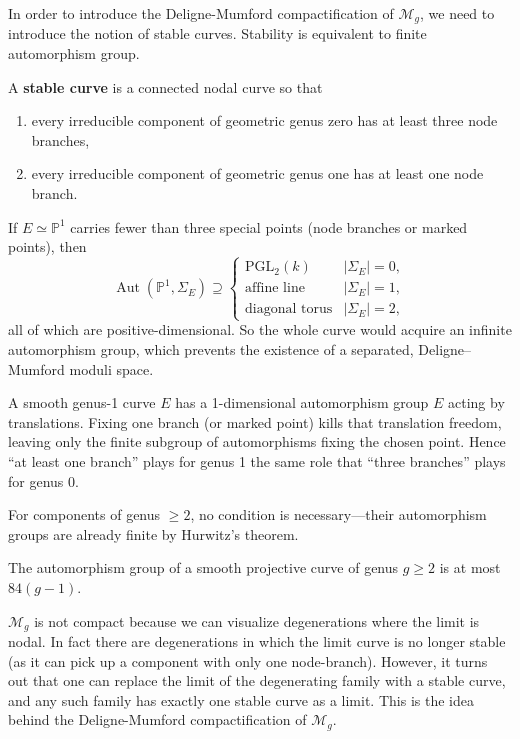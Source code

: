 \documentclass[12pt]{article}
\begin{document}
In order to introduce the Deligne-Mumford compactification of $\mathcal{M}_g$, we need to introduce the notion of stable curves. Stability is equivalent to finite automorphism group.
\begin{definition}
    A \textbf{stable curve} is a connected nodal curve so that \begin{enumerate}
        \item every irreducible component of geometric genus zero has at least three node branches,
        \item every irreducible component of geometric genus one has at least one node branch. 
    \end{enumerate}
\end{definition}

If $E \simeq \mathbb{P}^1$ carries fewer than three special points (node branches or marked points), then
    \[
    \operatorname{Aut}(\mathbb{P}^1, \Sigma_E) \supseteq
    \begin{cases}
        \mathrm{PGL}_2(k) & |\Sigma_E| = 0, \\[4pt]
        \text{affine line} & |\Sigma_E| = 1, \\[4pt]
        \text{diagonal torus} & |\Sigma_E| = 2,
    \end{cases}
    \]
    all of which are positive-dimensional. So the whole curve would acquire an infinite automorphism group, which prevents the existence of a separated, Deligne–Mumford moduli space.

A smooth genus-1 curve $E$ has a 1-dimensional automorphism group $E$ acting by translations. Fixing one branch (or marked point) kills that translation freedom, leaving only the finite subgroup of automorphisms fixing the chosen point. Hence “at least one branch” plays for genus 1 the same role that “three branches” plays for genus 0.

For components of genus $\geq 2$, no condition is necessary—their automorphism groups are already finite by Hurwitz's theorem.

\begin{theorem}
    [Hurwitz] The automorphism group of a smooth projective curve of genus $g \geq 2$ is at most $84(g-1)$.
\end{theorem}

$\mathcal{M}_g$ is not compact because we can visualize degenerations where the limit is nodal. In fact there are degenerations in which the limit curve is no longer stable (as it can pick up a component with only one node-branch). However, it turns out that one can replace the limit of the degenerating family with a stable curve, and any such family has exactly one stable curve as a limit. This is the idea behind the Deligne-Mumford compactification of $\mathcal{M}_g$.
\end{document}
